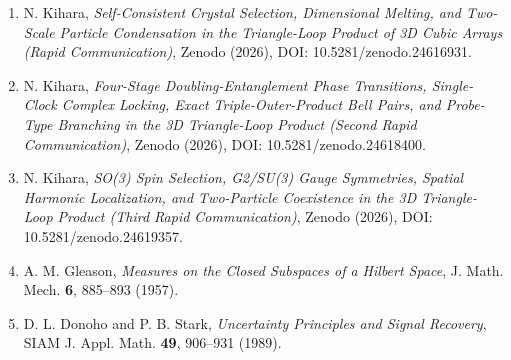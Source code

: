 \documentclass[
  a4paper,
]{ltjsarticle}
\providecommand{\tightlist}{%
  \setlength{\itemsep}{0pt}\setlength{\parskip}{0pt}}
\begin{document}
\begin{enumerate}
\def\labelenumi{\arabic{enumi}.}
\tightlist
\item
  N. Kihara, \emph{Self-Consistent Crystal Selection, Dimensional
  Melting, and Two-Scale Particle Condensation in the Triangle-Loop
  Product of 3D Cubic Arrays (Rapid Communication)}, Zenodo (2026), DOI:
  10.5281/zenodo.24616931.
\item
  N. Kihara, \emph{Four-Stage Doubling-Entanglement Phase Transitions,
  Single-Clock Complex Locking, Exact Triple-Outer-Product Bell Pairs,
  and Probe-Type Branching in the 3D Triangle-Loop Product (Second Rapid
  Communication)}, Zenodo (2026), DOI: 10.5281/zenodo.24618400.
\item
  N. Kihara, \emph{SO(3) Spin Selection, G2/SU(3) Gauge Symmetries,
  Spatial Harmonic Localization, and Two-Particle Coexistence in the 3D
  Triangle-Loop Product (Third Rapid Communication)}, Zenodo (2026),
  DOI: 10.5281/zenodo.24619357.
\item
  A. M. Gleason, \emph{Measures on the Closed Subspaces of a Hilbert
  Space}, J. Math. Mech. \textbf{6}, 885--893 (1957).
\item
  D. L. Donoho and P. B. Stark, \emph{Uncertainty Principles and Signal
  Recovery}, SIAM J. Appl. Math. \textbf{49}, 906--931 (1989).
\end{enumerate}
\end{document}
